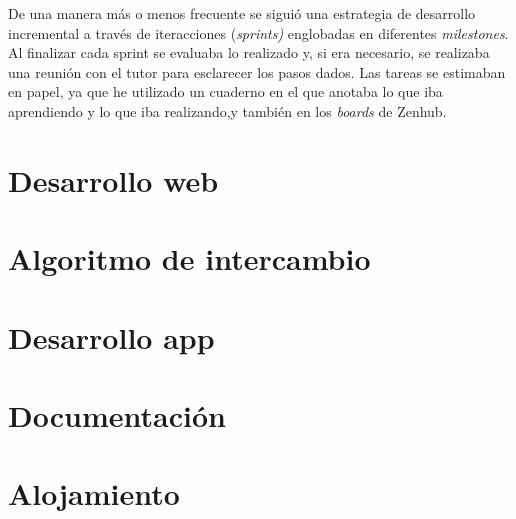  
 De una manera más o menos frecuente se siguió una estrategia de desarrollo incremental a través de iteracciones (\emph{sprints)} englobadas en diferentes \emph{milestones}. Al finalizar cada sprint se evaluaba lo realizado y, si era necesario, se realizaba una reunión con el tutor para esclarecer los pasos dados. Las tareas se estimaban en papel, ya que he utilizado un cuaderno en el que anotaba lo que iba aprendiendo y lo que iba realizando,y también en  los \emph{boards} de Zenhub. 
 
   \section{Desarrollo web}\label{dweb}
   
    \section{Algoritmo de intercambio}\label{algoritmo}
   
   \section{Desarrollo app}\label{dapp}
   
   \section{Documentación}\label{docs}
   
    \section{Alojamiento}\label{alojamiento}
 
 